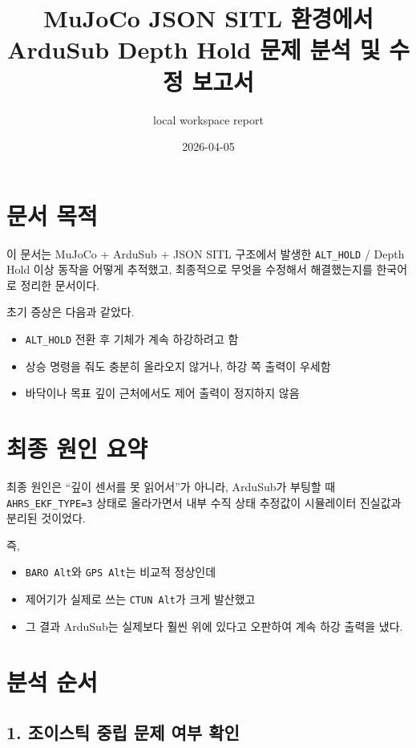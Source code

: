 \documentclass[11pt]{article}
\title{MuJoCo JSON SITL 환경에서\\ArduSub Depth Hold 문제 분석 및 수정 보고서}
\author{local workspace report}
\date{2026-04-05}
\begin{document}
\maketitle

\section{문서 목적}

이 문서는 MuJoCo + ArduSub + JSON SITL 구조에서 발생한 \texttt{ALT\_HOLD}
/ Depth Hold 이상 동작을 어떻게 추적했고, 최종적으로 무엇을 수정해서
해결했는지를 한국어로 정리한 문서이다.

초기 증상은 다음과 같았다.

\begin{itemize}[leftmargin=1.5em]
\item \texttt{ALT\_HOLD} 전환 후 기체가 계속 하강하려고 함
\item 상승 명령을 줘도 충분히 올라오지 않거나, 하강 쪽 출력이 우세함
\item 바닥이나 목표 깊이 근처에서도 제어 출력이 정지하지 않음
\end{itemize}

\section{최종 원인 요약}

최종 원인은 ``깊이 센서를 못 읽어서''가 아니라, ArduSub가 부팅할 때
\texttt{AHRS\_EKF\_TYPE=3} 상태로 올라가면서 내부 수직 상태 추정값이
시뮬레이터 진실값과 분리된 것이었다.

즉,

\begin{itemize}[leftmargin=1.5em]
\item \texttt{BARO Alt}와 \texttt{GPS Alt}는 비교적 정상인데
\item 제어기가 실제로 쓰는 \texttt{CTUN Alt}가 크게 발산했고
\item 그 결과 ArduSub는 실제보다 훨씬 위에 있다고 오판하여
      계속 하강 출력을 냈다.
\end{itemize}

\section{분석 순서}

\subsection{1. 조이스틱 중립 문제 여부 확인}
\end{document}
